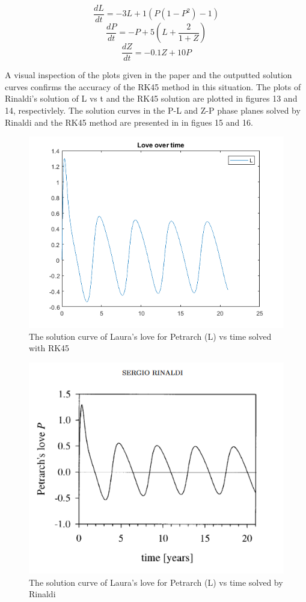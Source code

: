 \documentclass[11pt]{article}
\begin{document}
$$\frac{dL}{dt}=-3L+1(P(1-P^{2})-1)$$
$$\frac{dP}{dt}=-P+5(L+\frac{2}{1+Z})$$
$$\frac{dZ}{dt}=-0.1Z+10P$$

A visual inspection of the plots given in the paper and the outputted solution 
curves confirms the accuracy of the RK45 method in this situation. The plots of
Rinaldi's solution  of L vs t and the RK45 solution are plotted in figures 13
and 14, respectivlely. The solution curves in the P-L and Z-P phase planes
solved by Rinaldi and the RK45 method are presented in in figues 15 and 16.

\begin{figure} [h]
\centering
        \includegraphics[totalheight=10cm]{evol1.png}
    \caption{The solution curve of Laura's love for Petrarch (L) vs time solved with RK45}
    \label{figure5}
\end{figure}

\begin{figure} [h]
\centering
        \includegraphics[totalheight=10cm]{sergio.png}
    \caption{The solution curve of Laura's love for Petrarch (L) vs time solved by Rinaldi}
    \label{figure6}
\end{figure}
\end{document}
